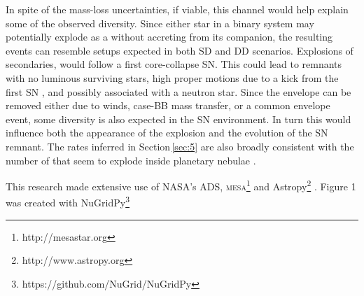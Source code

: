 \documentclass[twocolumn]{aa}
\begin{document}
In spite of the mass-loss 
uncertainties, if viable, this channel would help explain some of the observed \ia diversity. Since either star in a binary system may potentially explode 
as a \ia without accreting from its  companion, the resulting events can resemble setups expected in both SD and DD scenarios. Explosions of 
secondaries, would follow a first core-collapse SN. This 
could lead to \ia remnants with no luminous surviving stars, high proper motions due to a kick from the first SN \cite[like the Kepler SN remnant,][]{Chiotellis:2011jy}, and  possibly associated with a neutron star. 
Since the  envelope can be removed either due to winds, case-BB mass transfer, or a common envelope event, some diversity is also expected in 
the SN environment. In turn this would influence both the 
appearance of the explosion and the evolution of the SN remnant. The rates inferred in Section\,\ref{sec:5} are also broadly consistent with the 
number of \ias that seem to explode inside planetary 
nebulae \citep[$\sim 20\%$;][]{Tsebrenko:2014kea}.  
          



\begin{acknowledgements}
%
 This research made extensive use of NASA's ADS, \textsc{mesa}\footnote{http://mesastar.org} \citep{Paxton:2010ji,Paxton:2013pj,Paxton:2015jva,Paxton:2017eie} and Astropy\footnote{http://www.astropy.org} \citep{Price-Whelan:2018hus}. Figure 1 was created with NuGridPy\footnote{https://github.com/NuGrid/NuGridPy}
\end{acknowledgements}


 

\end{document}
